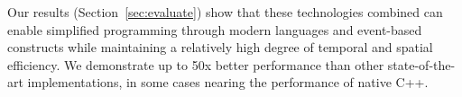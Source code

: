 Our results (Section~\ref{sec:evaluate}) show that these technologies combined can enable simplified programming through modern languages and event-based constructs while maintaining a relatively high degree of temporal and spatial efficiency. We demonstrate up to 50x better performance than other state-of-the-art implementations,
in some cases nearing the performance of native C++.
















